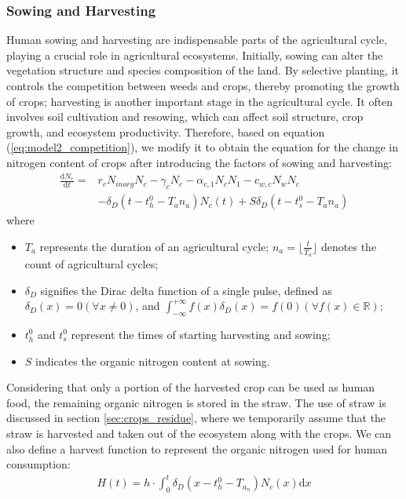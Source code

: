 \documentclass{mcmthesis}
\begin{document}
\subsubsection{Sowing and Harvesting}

Human sowing and harvesting are indispensable parts of the agricultural cycle, playing a crucial role in agricultural ecosystems. Initially, sowing can alter the vegetation structure and species composition of the land. By selective planting, it controls the competition between weeds and crops, thereby promoting the growth of crops; harvesting is another important stage in the agricultural cycle. It often involves soil cultivation and resowing, which can affect soil structure, crop growth, and ecosystem productivity. Therefore, based on equation (\ref{eq:model2_competition}), we modify it to obtain the equation for the change in nitrogen content of crops after introducing the factors of sowing and harvesting:
\begin{align}
\label{eq:organic_nitrogen_with harvest}
    \frac{\mathrm{d}N_c}{\mathrm{d}t}=&r_cN_{inorg}N_c-\gamma _cN_c-\alpha _{c,1}N_cN_1-c_{w,c}N_wN_c \nonumber \\  
 &-\boxed{\delta _D\left( t-t_{h}^{0}-T_an_a \right) N_c\left( t \right)}
+ \boxed{S\delta _D\left( t-t_{s}^{0}-T_an_a \right)}
\end{align}
where
\begin{itemize}
    \item $T_a$ represents the duration of an agricultural cycle; $n_a = \lfloor \frac{t}{T_a} \rfloor$ denotes the count of agricultural cycles;
    \item $\delta_D$ signifies the Dirac delta function of a single pulse, defined as $\delta_D(x) = 0 (\forall x \neq 0)$, and $\int_{-\infty}^{+\infty}f(x)\delta_D(x) = f(0)(\forall f(x)\in \mathbb{R})$;
    \item $t_h^0$ and $t_s^0$ represent the times of starting harvesting and sowing;
    \item $S$ indicates the organic nitrogen content at sowing.
\end{itemize}

Considering that only a portion of the harvested crop can be used as human food, the remaining organic nitrogen is stored in the straw. The use of straw is discussed in section \ref{sec:crops_residue}, where we temporarily assume that the straw is harvested and taken out of the ecosystem along with the crops. We can also define a harvest function to represent the organic nitrogen used for human consumption:
\begin{align}
\label{eq:harvest_function}
    H(t) = h \cdot \int_0^t \delta_D( x - t_{h}^{0} - T_{a_n} ) N_c (x) \mathrm{d}x
\end{align}
\end{document}
